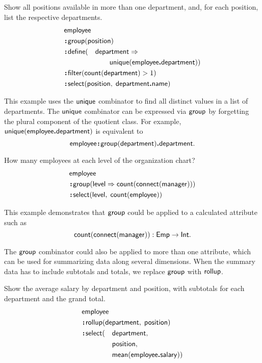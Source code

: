 \begin{demo}
    \label{ex:unique-department}
    Show all positions available in more than one department, and, for each
    position, list the respective departments.
    \begin{alignat*}{2}
        & \Employee\hidewidth &&  \\
        & \Apply\Group(\Position)\hidewidth && \\
        & \Apply\Define(&& \Department\As \\
        & && \qquad \Unique(\Employee\To\Department)) \\
        & \Apply\Filter(\Count(\Department) > 1)\hidewidth && \\
        & \Apply\Select(\Position,\; \Department\To\Name)\hidewidth &&
    \end{alignat*}
\end{demo}

This example uses the $\textup{\textsf{unique}}$ combinator to find all distinct values in a
list of departments.  The $\textup{\textsf{unique}}$ combinator can be expressed via $\textup{\textsf{group}}$ by
forgetting the plural component of the quotient class.  For example,
$\textup{\textsf{unique}}(\textup{\textsf{employee}}\boldsymbol{.}\textup{\textsf{department}})$ is equivalent to
\begin{equation*}
    \textup{\textsf{employee}}\!\boldsymbol{:}\!\textup{\textsf{group}}(\textup{\textsf{department}})\boldsymbol{.}\textup{\textsf{department}}.
\end{equation*}

\begin{demo}
    \label{ex:employee-group-level}
    How many employees at each level of the organization chart?
    \begin{align*}
        & \textup{\textsf{employee}} \\
        & \!\boldsymbol{:}\!\textup{\textsf{group}}(\textup{\textsf{level}}\Rightarrow\textup{\textsf{count}}(\textup{\textsf{connect}}(\textup{\textsf{manager}}))) \\
        & \!\boldsymbol{:}\!\textup{\textsf{select}}(\textup{\textsf{level}},\; \textup{\textsf{count}}(\textup{\textsf{employee}}))
    \end{align*}
\end{demo}

This example demonstrates that $\textup{\textsf{group}}$ could be applied to a calculated
attribute such as
\begin{equation*}
    \textup{\textsf{count}}(\textup{\textsf{connect}}(\textup{\textsf{manager}})) : \textup{\textsf{Emp}} \to \textup{\textsf{Int}}.
\end{equation*}

The $\textup{\textsf{group}}$ combinator could also be applied to more than one attribute, which
can be used for summarizing data along several dimensions.  When the summary
data has to include subtotals and totals, we replace $\textup{\textsf{group}}$ with $\textup{\textsf{rollup}}$.

\begin{demo}
    \label{ex:rollup}
    Show the average salary by department and position, with subtotals for each
    department and the grand total.
    \begin{alignat*}{2}
        & \Employee\hidewidth && \\
        & \Apply\Rollup(\Department,\; \Position)\hidewidth && \\
        & \Apply\Select(&& \Department, \\
        & && \Position, \\
        & && \Mean(\Employee\To\Salary))
    \end{alignat*}
\end{demo}

